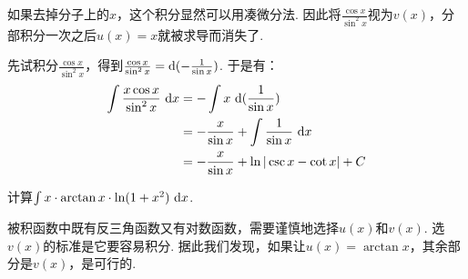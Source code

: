 \begin{analysis}
如果去掉分子上的$x$，这个积分显然可以用凑微分法. 因此将$\frac{\cos x}{\sin^2 x}$视为$v(x)$，分部积分一次之后$u(x)=x$就被求导而消失了.
\end{analysis}

\begin{solution}
先试积分$\frac{\cos x}{\sin^2 x}$，得到$\frac{\cos x}{\sin^2 x} = \mathrm{d} (-\frac{1}{\sin x})$. 于是有：
\begin{equation}
    \begin{aligned}
        \int \frac{x \cos x}{\sin^2 x}~\mathrm{d} x
        &= -\int x ~\mathrm{d} (\frac{1}{\sin x}) \\
        &= -\frac{x}{\sin x} + \int \frac{1}{\sin x} ~\mathrm{d} x \\
        &= -\frac{x}{\sin x} + \ln |\csc x - \cot x| +C
        \nonumber
    \end{aligned}
\end{equation}
\end{solution}

\begin{example}
\label{ex:ch03-26}
计算$\int x \cdot \arctan x \cdot  \ln (1+x^2)~\mathrm{d} x$.
\end{example}

\begin{analysis}
被积函数中既有反三角函数又有对数函数，需要谨慎地选择$u(x)$和$v(x)$.
选$v(x)$的标准是它要容易积分. 据此我们发现，如果让$u(x)=\arctan x$，其余部分是$v(x)$，是可行的.
\end{analysis}

